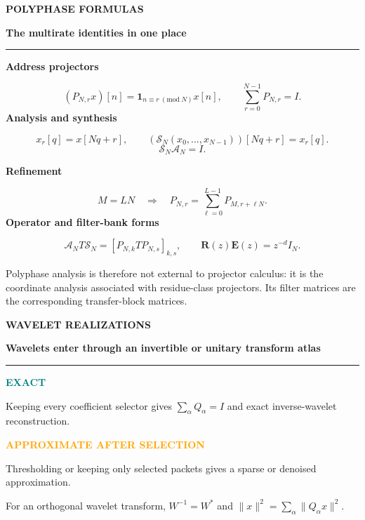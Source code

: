 \documentclass[10pt]{article}
\newcommand{\PageTitle}[2][]{%
  {\color{Muted}\fontsize{9.5}{11}\selectfont\bfseries #1}\par
  \vspace{0.02in}
  {\color{Ink}\fontsize{20}{23}\selectfont\bfseries #2}\par
  \vspace{0.07in}
  {\color{Blue}\rule{\linewidth}{1.15pt}}\par
  \vspace{0.08in}
}
\newcommand{\Callout}[2][PaleBlue]{%
  \noindent\colorbox{#1}{\parbox{0.965\linewidth}{\vspace{2pt}\small\RaggedRight #2\par\vspace{2pt}}}
}
\newcommand{\ExactBadge}{\colorbox{PaleTeal}{\strut\textcolor{Teal}{\bfseries EXACT}}}
\newcommand{\ApproxBadge}{\colorbox{PaleOrange}{\strut\textcolor{Orange}{\bfseries APPROXIMATE AFTER SELECTION}}}
\newcommand{\TwoBox}[4]{%
\begin{minipage}[t]{0.485\linewidth}
\colorbox{#1}{\parbox{0.94\linewidth}{\vspace{7pt}\small\RaggedRight #2\par\vspace{7pt}}}
\end{minipage}\hfill
\begin{minipage}[t]{0.485\linewidth}
\colorbox{#3}{\parbox{0.94\linewidth}{\vspace{7pt}\small\RaggedRight #4\par\vspace{7pt}}}
\end{minipage}
}
\begin{document}
\clearpage
\PageTitle[POLYPHASE FORMULAS]{The multirate identities in one place}
\begin{minipage}[t]{0.48\linewidth}
\colorbox{PaleTeal}{\parbox{0.94\linewidth}{
\vspace{7pt}
\textbf{Address projectors}\par
\[
(P_{N,r}x)[n]=\mathbf 1_{n\equiv r\ (\mathrm{mod}\ N)}x[n],\qquad
\sum_{r=0}^{N-1}P_{N,r}=I.
\]
\textbf{Analysis and synthesis}\par
\[
x_r[q]=x[Nq+r],\qquad
(\mathcal S_N(x_0,\ldots,x_{N-1}))[Nq+r]=x_r[q].
\]
\[
\mathcal S_N\mathcal A_N=I.
\]
\vspace{6pt}}}
\end{minipage}\hfill
\begin{minipage}[t]{0.48\linewidth}
\colorbox{PaleOrange}{\parbox{0.94\linewidth}{
\vspace{7pt}
\textbf{Refinement}\par
\[
M=LN\quad\Longrightarrow\quad
P_{N,r}=\sum_{\ell=0}^{L-1}P_{M,r+\ell N}.
\]
\textbf{Operator and filter-bank forms}\par
\[
\mathcal A_NT\mathcal S_N=[P_{N,k}TP_{N,s}]_{k,s},
\qquad
\mathbf R(z)\mathbf E(z)=z^{-d}I_N.
\]
\vspace{6pt}}}
\end{minipage}
\vspace{0.26in}
\Callout[PaleMagenta]{Polyphase analysis is therefore not external to projector calculus: it is the coordinate analysis associated with residue-class projectors. Its filter matrices are the corresponding transfer-block matrices.}

\clearpage
\PageTitle[WAVELET REALIZATIONS]{Wavelets enter through an invertible or unitary transform atlas}
\begin{center}
\end{center}
\vspace{0.18in}
\TwoBox{PaleTeal}{\ExactBadge\quad Keeping every coefficient selector gives $\sum_\alpha Q_\alpha=I$ and exact inverse-wavelet reconstruction.}{PaleOrange}{\ApproxBadge\quad Thresholding or keeping only selected packets gives a sparse or denoised approximation.}
\vfill
\Callout{For an orthogonal wavelet transform, $W^{-1}=W^*$ and $\|x\|^2=\sum_\alpha\|Q_\alpha x\|^2$.}
\end{document}
